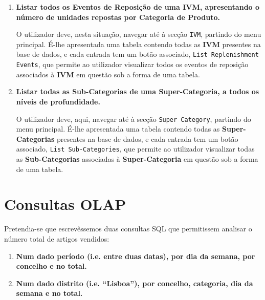 \documentclass[12pt,a4paper]{article}
\begin{document}
\begin{enumerate}
    \item \textbf{Listar todos os Eventos de Reposição de uma IVM, apresentando
    o número de unidades repostas por Categoria de Produto.}

    O utilizador deve, nesta situação, navegar até à secção \texttt{IVM},
    partindo do menu principal. É-lhe apresentada uma tabela contendo todas as
    \textbf{IVM} presentes na base de dados, e cada entrada tem um botão
    associado, \texttt{List Replenishment Events}, que permite ao utilizador
    visualizar todos os eventos de reposição associados à \textbf{IVM} em questão
    sob a forma de uma tabela.
    
    \item \textbf{Listar todas as Sub-Categorias de uma Super-Categoria, a todos
    os níveis de profundidade.}

    O utilizador deve, aqui, navegar até à secção \texttt{Super Category},
    partindo do menu principal. É-lhe apresentada uma tabela contendo todas as
    \textbf{Super-Categorias} presentes na base de dados, e cada entrada tem um
    botão associado, \texttt{List Sub-Categories}, que permite ao utilizador
    visualizar todas as \textbf{Sub-Categorias} associadas à \textbf{Super-Categoria}
    em questão sob a forma de uma tabela.

  \end{enumerate}


  \section*{Consultas OLAP}

  Pretendia-se que escrevêssemos duas consultas SQL que permitissem analisar o número
  total de artigos vendidos:

  \begin{enumerate}
    \item \textbf{Num dado período (i.e. entre duas datas), por dia da semana, por concelho e no total.}
    
    

    \vspace*{2.5cm}

    \item \textbf{Num dado distrito (i.e. “Lisboa”), por concelho, categoria, dia da semana e no total.}
  
    
  \end{enumerate}
\end{document}

